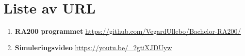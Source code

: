 
\chapter*{Liste av URL}
\thispagestyle{fancy}

\begin{enumerate}
    \item \textbf{RA200 programmet} \url{https://github.com/VegardUllebo/Bachelor-RA200/}
    \item \textbf{Simuleringsvideo}   \url{https://youtu.be/_2gtiXJDUyw}
\end{enumerate}

